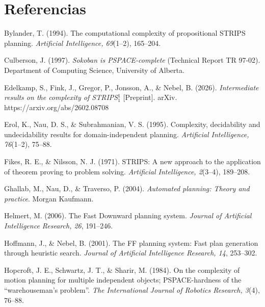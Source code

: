 \documentclass[11pt,letterpaper]{article}
\theoremstyle{plain}
\theoremstyle{definition}
\theoremstyle{remark}
\begin{document}
\newpage
\section*{Referencias}
\begin{list}{}{\setlength{\leftmargin}{1.27cm}\setlength{\itemindent}{-1.27cm}\setlength{\labelwidth}{0pt}\setlength{\labelsep}{0pt}\setlength{\itemsep}{6pt}\setlength{\parsep}{0pt}}
\sloppy

\item Bylander, T. (1994). The computational complexity of propositional STRIPS planning. \textit{Artificial Intelligence, 69}(1--2), 165--204.

\item Culberson, J. (1997). \textit{Sokoban is PSPACE-complete} (Technical Report TR 97-02). Department of Computing Science, University of Alberta.

\item Edelkamp, S., Fink, J., Gregor, P., Jonsson, A., \& Nebel, B. (2026). \textit{Intermediate results on the complexity of STRIPS$_{1}^{1}$} [Preprint]. arXiv. https://arxiv.org/abs/2602.08708

\item Erol, K., Nau, D. S., \& Subrahmanian, V. S. (1995). Complexity, decidability and undecidability results for domain-independent planning. \textit{Artificial Intelligence, 76}(1--2), 75--88.

\item Fikes, R. E., \& Nilsson, N. J. (1971). STRIPS: A new approach to the application of theorem proving to problem solving. \textit{Artificial Intelligence, 2}(3--4), 189--208.

\item Ghallab, M., Nau, D., \& Traverso, P. (2004). \textit{Automated planning: Theory and practice}. Morgan Kaufmann.

\item Helmert, M. (2006). The Fast Downward planning system. \textit{Journal of Artificial Intelligence Research, 26}, 191--246.

\item Hoffmann, J., \& Nebel, B. (2001). The FF planning system: Fast plan generation through heuristic search. \textit{Journal of Artificial Intelligence Research, 14}, 253--302.

\item Hopcroft, J. E., Schwartz, J. T., \& Sharir, M. (1984). On the complexity of motion planning for multiple independent objects; PSPACE-hardness of the ``warehouseman's problem''. \textit{The International Journal of Robotics Research, 3}(4), 76--88.


\end{list}
\end{document}
